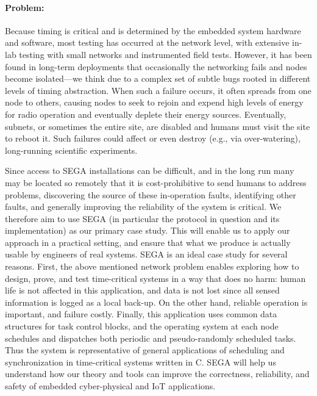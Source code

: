 \paragraph{Problem:}

Because timing is critical and is determined by the embedded system hardware and software, most testing has occurred at the network level, with extensive in-lab testing with small networks and instrumented field tests.
However, it has been found in long-term deployments %
that occasionally the networking fails and nodes become isolated---we think due to a complex set of subtle bugs rooted in different levels of timing abstraction.
When such a failure occurs, it often spreads from one node to others,
causing nodes to seek to rejoin and expend high levels of energy for radio operation and eventually deplete their energy sources.
Eventually, subnets, or sometimes the entire site, are disabled and humans must visit the site to reboot it.
Such failures could %
affect %
or even destroy (e.g., via over-watering), long-running scientific experiments.


Since access to SEGA installations can be difficult, and in the long run many may be located so remotely that it is cost-prohibitive to send humans to address problems, discovering the source of these in-operation faults, identifying other faults, and generally improving the reliability of the system is critical.
We therefore aim to use SEGA (in particular the protocol in question and its implementation) as our primary case study.
This will enable us to apply our approach in a practical setting, and ensure that what we produce is actually usable by engineers of real systems.
%
SEGA is an ideal case study for several reasons.
First, the above mentioned network problem enables exploring how to design, prove, and test time-critical systems in a way that does no harm: human life is not affected in this application, and data is not lost since all sensed information is logged as a local back-up.
On the other hand, reliable operation is important, and failure costly. %
Finally, this application uses common data structures for task control blocks, and the operating system at each node schedules and dispatches both periodic and pseudo-randomly scheduled tasks.
Thus the system is representative of %
general applications of scheduling and synchronization in time-critical systems written in C.
SEGA will help us understand how our theory and tools can improve the correctness, reliability, and safety of embedded cyber-physical and IoT applications.


